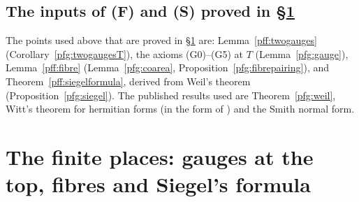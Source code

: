 \documentclass[10pt]{amsart}
\theoremstyle{definition}
\theoremstyle{remark}
\providecommand{\auO}{\mathcal O}
\providecommand{\auPl}{\Phi}
\providecommand{\auU}{\mathrm U}
\begin{document}
\subsection{The inputs of \textup{(F)} and \textup{(S)} proved in \S\ref{pfg:sec}}\label{pff:ss-pending}

The points used above that are proved in \S\ref{pfg:sec} are: Lemma~\ref{pff:twogauges}
(Corollary~\ref{pfg:twogaugesT}), the axioms (G0)--(G5) at $T$ (Lemma~\ref{pfg:gauge}), Lemma~\ref{pff:fibre}
(Lemma~\ref{pfg:coarea}, Proposition~\ref{pfg:fibrepairing}), and Theorem~\ref{pff:siegelformula}, derived from Weil's
theorem (Proposition~\ref{pfg:siegel}). The published results used are Theorem~\ref{pfg:weil}, Witt's theorem for hermitian forms
(in the form of {\cite[Lemma~7.12]{P51}}) and the Smith normal form.



\providecommand{\auO}{\mathcal O}
\providecommand{\auA}{\mathbb A}
\providecommand{\auU}{\mathrm U}
\providecommand{\auGL}{\mathrm{GL}}
\providecommand{\auPl}{\Phi}
\providecommand{\aurd}{\mathrm{rd}_E}
\providecommand{\aubar}[1]{\overline{#1}}
\providecommand{\panot}[1]{\par\smallskip{\raggedright\noindent\textbf{[Not proved here:} #1\textbf{]}\par}\smallskip}
\providecommand{\pbvol}{\operatorname{vol}}
\providecommand{\pbmvol}{\mathsf v}
\providecommand{\pffET}{E_T}
\providecommand{\pffOT}{\auO_T}
\providecommand{\pffG}{G_T}
\providecommand{\pffK}{K_T}
\providecommand{\pffKM}{K_T(M)}
\providecommand{\pffch}{\chi_M}
\providecommand{\pffW}{W_Z}
\providecommand{\pffZ}{\mathsf Z}
\providecommand{\pfrK}{\mathsf K}
\providecommand{\pfrG}{\mathsf G}
\providecommand{\pfrU}{\mathsf U}
\providecommand{\pfrR}{\mathsf R}
\providecommand{\pfrCl}{\mathcal C}
\providecommand{\pfrkap}{\kappa}
\providecommand{\pfrdep}{\operatorname{dp}}
\providecommand{\pfrip}[2]{\langle#1,#2\rangle}
\providecommand{\pbmXp}{X^{+}}
\providecommand{\pfgH}{\mathrm{Herm}_T}
\providecommand{\pfgS}{\mathrm{Skew}_T}
\providecommand{\pfgOh}{\auO_{\mathrm h}}
\providecommand{\pfgOs}{\auO_{\mathrm s}}
\providecommand{\pfgE}{\mathsf e}
\providecommand{\pfgD}{\mathsf D}
\providecommand{\pfgEb}{\mathcal E}
\providecommand{\pfgQ}{\mathsf Q_N}
\providecommand{\pfgz}{\zeta_{\pffOT}}

\section{The finite places: gauges at the top, fibres and Siegel's formula}\label{pfg:sec}
\end{document}
